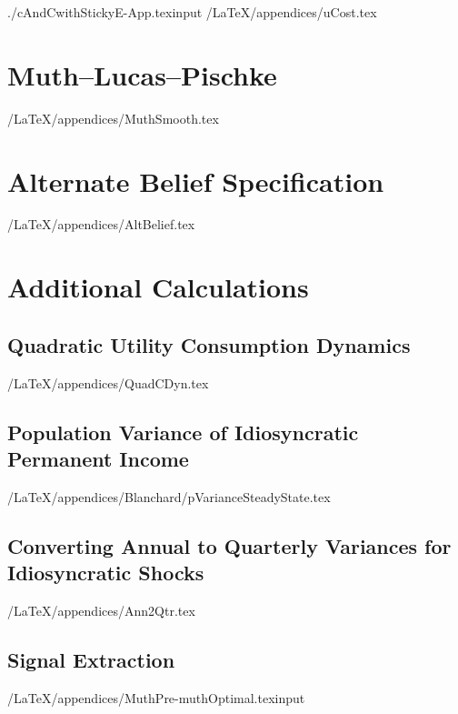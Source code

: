 \documentclass[titlepage]{\econtex}
\newcommand{\texname}{cAndCwithStickyE-App}
\begin{document}
\begin{verbatimwrite}{./cAndCwithStickyE-App.texinput}
\econtexRoot/LaTeX/appendices/uCost.tex


\hypertarget{How-MLP-Generates-Smoothness}{}
\section{Muth--Lucas--Pischke}

\econtexRoot/LaTeX/appendices/MuthSmooth.tex


\section{Alternate Belief Specification}\label{appendix:AltBelief}

\econtexRoot/LaTeX/appendices/AltBelief.tex


\section{Additional Calculations}

\subsection{Quadratic Utility Consumption Dynamics}\label{appendix:QuadCDyn}

\econtexRoot/LaTeX/appendices/QuadCDyn.tex







\subsection{Population Variance of Idiosyncratic Permanent Income}\label{appendix:pss}

\econtexRoot/LaTeX/appendices/Blanchard/pVarianceSteadyState.tex

\subsection{Converting Annual to Quarterly Variances for Idiosyncratic Shocks}\label{appendix:Ann2Qtr}

\econtexRoot/LaTeX/appendices/Ann2Qtr.tex

\subsection{\cite{muthOptimal} Signal Extraction}\label{appendix:Muth}

\econtexRoot/LaTeX/appendices/MuthPre-muthOptimal.texinput

\end{verbatimwrite}


\small

\normalsize
\end{document}

